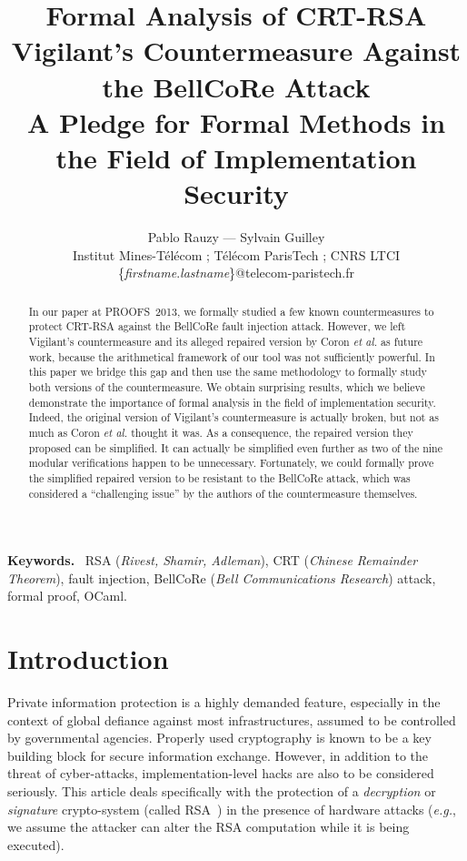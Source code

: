\documentclass[10pt]{article}
\title{\textbf{Formal Analysis of CRT-RSA Vigilant's Countermeasure Against the BellCoRe Attack}\\
  {\smaller \smaller A Pledge for Formal Methods in the Field of Implementation Security}}
\author{Pablo Rauzy --- Sylvain Guilley\\
Institut Mines-Télécom ; Télécom ParisTech ; CNRS LTCI\\
\{{\it firstname}.{\it lastname}\}@telecom-paristech.fr}
\date{}
\newcommand{\keywords}{\textbf{Keywords.}~}
\theoremstyle{definition}
\theoremstyle{theorem}
\newcommand{\eg}{\textit{e.g.}}
\newcommand{\etal}{\textit{et al.}\xspace}
\begin{document}
\maketitle

\begin{abstract}
In our paper at PROOFS~2013, we formally studied a few known countermeasures to protect CRT-RSA against the BellCoRe fault injection attack.
However, we left Vigilant's countermeasure and its alleged repaired version by Coron \etal as future work, because the arithmetical framework of our tool was not sufficiently powerful.
In this paper we bridge this gap and then use the same methodology to formally study both versions of the countermeasure.
We obtain surprising results, which we believe demonstrate the importance of formal analysis in the field of implementation security.
Indeed, the original version of Vigilant's countermeasure is actually broken, but not as much as Coron \etal thought it was.
As a consequence, the repaired version they proposed can be simplified.
It can actually be simplified even further as two of the nine modular verifications happen to be unnecessary.
Fortunately, we could formally prove the simplified repaired version to be resistant to the BellCoRe attack, which was considered a ``challenging issue'' by the authors of the countermeasure themselves.
\end{abstract}

\keywords
RSA (\textit{Rivest, Shamir, Adleman}),
CRT (\textit{Chinese Remainder Theorem}),
fault injection,
BellCoRe (\textit{Bell Communications Research}) attack,
formal proof,
OCaml.

\section{Introduction}

Private information protection is a highly demanded feature, especially in the context of global defiance against most infrastructures, assumed to be controlled by governmental agencies.
Properly used cryptography is known to be a key building block for secure information exchange.
However, in addition to the threat of cyber-attacks, implementation-level hacks are also to be considered seriously.
This article deals specifically with the protection of a \emph{decryption} or \emph{signature} crypto-system (called RSA~\cite{DBLP:journals/cacm/RivestSA78}) in the presence of hardware attacks (\eg, we assume the attacker can alter the RSA computation while it is being executed).
\end{document}
